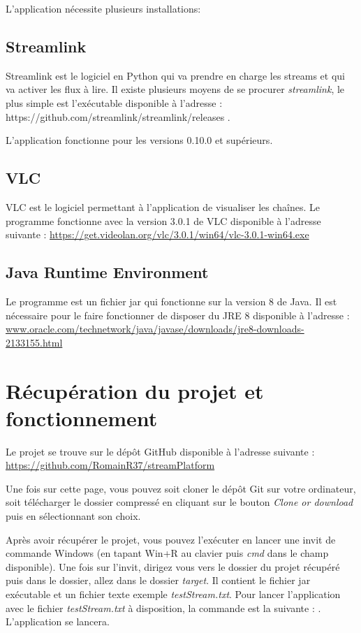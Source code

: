 \documentclass{polytech/polytech}
\begin{document}
L'application nécessite plusieurs installations:

\subsection{Streamlink}

Streamlink est le logiciel en Python qui va prendre en charge les streams et qui va activer les flux à lire. Il existe plusieurs moyens de se procurer \textit{streamlink}, le plus simple est l'exécutable disponible à l'adresse : https://github.com/streamlink/streamlink/releases .

L'application fonctionne pour les versions 0.10.0 et supérieurs.

\subsection{VLC}

VLC est le logiciel permettant à l'application de visualiser les chaînes. Le programme  fonctionne avec la version 3.0.1 de VLC disponible à l'adresse suivante : \url{https://get.videolan.org/vlc/3.0.1/win64/vlc-3.0.1-win64.exe}


\subsection{Java Runtime Environment}

Le programme est un fichier jar qui fonctionne sur la version 8 de Java. Il est nécessaire pour le faire fonctionner de disposer du JRE 8 disponible à l'adresse : \url{www.oracle.com/technetwork/java/javase/downloads/jre8-downloads-2133155.html}


\section{Récupération du projet et fonctionnement}

Le projet se trouve sur le dépôt GitHub disponible à l'adresse suivante : \url{https://github.com/RomainR37/streamPlatform}

Une fois sur cette page, vous pouvez soit cloner le dépôt Git sur votre ordinateur, soit télécharger le dossier compressé en cliquant sur le bouton \textit{Clone or download} puis en sélectionnant son choix.

Après avoir récupérer le projet, vous pouvez l'exécuter en lancer une invit de commande Windows (en tapant Win+R au clavier puis \textit{cmd} dans le champ disponible). Une fois sur l'invit, dirigez vous vers le dossier du projet récupéré puis dans le dossier, allez dans le dossier \textit{target}. Il contient le fichier jar exécutable et un fichier texte exemple \textit{testStream.txt}. Pour lancer l'application avec le fichier \textit{testStream.txt} à disposition, la commande est la suivante : . L'application se lancera.
\end{document}
